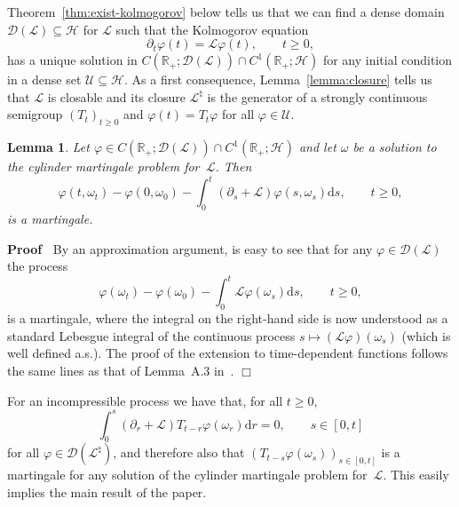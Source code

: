 \documentclass{article}
\newcommand{\mathd}{\mathrm{d}}
\newenvironment{proof}{\noindent\textbf{Proof\ }}{\hspace*{\fill}$\Box$\medskip}
\newtheorem{lemma}{Lemma}
\begin{document}
Theorem~\ref{thm:exist-kolmogorov} below tells us that we can find a dense
domain $\mathcal{D} (\mathcal{L}) \subseteq \mathcal{H}$ for $\mathcal{L}$
such that the Kolmogorov equation
\begin{equation}
  \partial_t \varphi (t) =\mathcal{L} \varphi (t), \qquad t \geqslant 0,
  \label{eq:kolm}
\end{equation}
has a unique solution in $C (\mathbb{R}_+ ; \mathcal{D} (\mathcal{L})) \cap
C^1 (\mathbb{R}_+ ; \mathcal{H})$ for any initial condition in a dense set
$\mathcal{U} \subseteq \mathcal{H}$. As a first consequence,
Lemma~\ref{lemma:closure} tells us that $\mathcal{L}$ is closable and its
closure $\mathcal{L}^{\natural}$ is the generator of a strongly continuous
semigroup $(T_t)_{t \geqslant 0}$ and $\varphi (t) = T_t \varphi$ for all
$\varphi \in \mathcal{U}$.

\begin{lemma}
  \label{lem:ismart}Let $\varphi \in C (\mathbb{R}_+ ; \mathcal{D}
  (\mathcal{L})) \cap C^1 (\mathbb{R}_+ ; \mathcal{H})$ and let $\omega$ be a
  solution to the cylinder martingale problem for~$\mathcal{L}$. Then
  \[ \varphi (t, \omega_t) - \varphi (0, \omega_0) - \int_0^t (\partial_s
     +\mathcal{L}) \varphi (s, \omega_s) \mathd s, \qquad t \geqslant 0, \]
  is a martingale.
\end{lemma}

\begin{proof}
  By an approximation argument, is easy to see that for any $\varphi \in
  \mathcal{D} (\mathcal{L})$ the process
  \[ \varphi (\omega_t) - \varphi (\omega_0) - \int_0^t \mathcal{L} \varphi
     (\omega_s) \mathd s, \qquad t \geqslant 0, \]
  is a martingale, where the integral on the right-hand side is now understood
  as a standard Lebesgue integral of the continuous process $s \mapsto
  (\mathcal{L} \varphi) (\omega_s)$ (which is well defined a.s.). The proof of
  the extension to time-dependent functions follows the same lines as that of
  Lemma~A.3 in~{\cite{gubinelli2018infinitesimal}}.
\end{proof}

For an incompressible process we have that, for all $t \geqslant 0$,
\[ \int_0^s (\partial_r +\mathcal{L}) T_{t - r} \varphi (\omega_r) \mathd r =
   0, \qquad s \in [0, t] \]
for all $\varphi \in \mathcal{D} (\mathcal{L}^{\natural})$, and therefore also
that $(T_{t - s} \varphi (\omega_s))_{s \in [0, t]}$ is a martingale for any
solution of the cylinder martingale problem for~$\mathcal{L}$. This easily
implies the main result of the paper.
\end{document}
